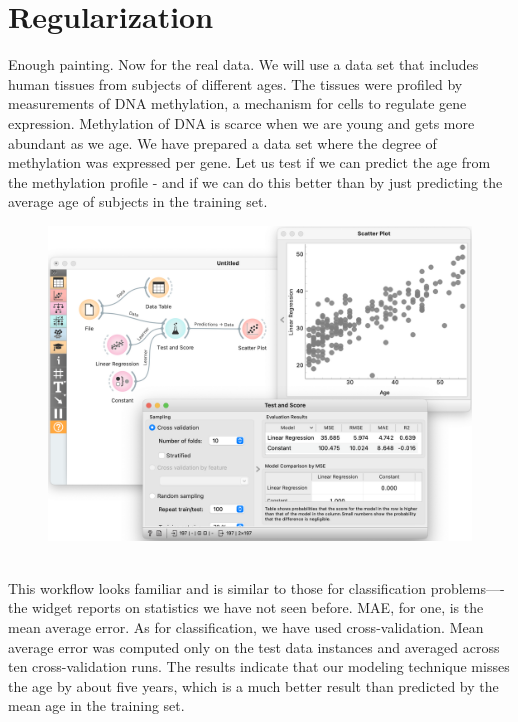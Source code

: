 \chapter{Regularization}
\label{ch:regularization}

Enough painting.  Now for the real data. We will use a data set that includes human tissues from subjects of different ages. The tissues were profiled by measurements of DNA methylation, a mechanism for cells to regulate gene expression. Methylation of DNA is scarce when we are young and gets more abundant as we age. We have prepared a data set where the degree of methylation was expressed per gene. Let us test if we can predict the age from the methylation profile - and if we can do this better than by just predicting the average age of subjects in the training set.

\begin{figure}[h]
    \centering
    \includegraphics[scale=0.35]{methylation.png}
    \caption{$\;$}
\end{figure}

This workflow looks familiar and is similar to those for classification problems—-the  widget reports on statistics we have not seen before. MAE, for one, is the mean average error. As for classification, we have used cross-validation. Mean average error was computed only on the test data instances and averaged across ten cross-validation runs. The results indicate that our modeling technique misses the age by about five years, which is a much better result than predicted by the mean age in the training set.